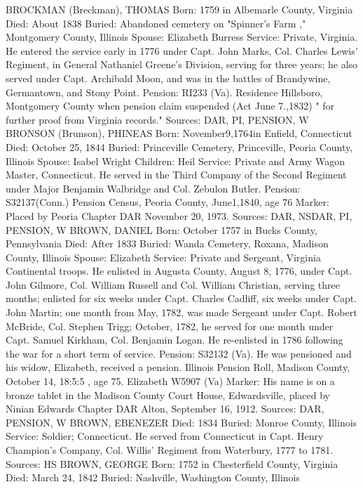 BROCKMAN (Breckman), THOMAS 
Born: 1759 in Albemarle County, Virginia 
Died: About 1838 
Buried: Abandoned cemetery on "Spinner's Farm ," Montgomery County, Illinois 
Spouse: Elizabeth Burress 
Service: Private, Virginia. He entered the service early in 1776 under Capt. John Marks, Col. Charles Lewis' Regiment, in General Nathaniel Greene's Division, serving for three years; he also served under Capt. Archibald Moon, and was in the battles of Brandywine, Germantown, and Stony Point. Pension: RI233 (Va). Residence Hillsboro, Montgomery County when pension claim suspended (Act June 7.,1832) " for further proof from Virginia records." 
Sources: DAR, PI, PENSION, W 
BRONSON (Brunson), PHINEAS 
Born: November9,1764in Enfield, Connecticut 
Died: October 25, 1844 
Buried: Princeville Cemetery, Princeville, Peoria County, Illinois 
Spouse: Isabel Wright 
Children: Heil 
Service: Private and Army Wagon Master, Connecticut. He served in the Third Company of the Second Regiment under Major Benjamin Walbridge and Col. Zebulon Butler. 
Pension: S32137(Conn.) Pension Census, Peoria County, June1,1840, age 76 
Marker: Placed by Peoria Chapter DAR November 20, 1973. 
Sources: DAR, NSDAR, PI, PENSION, W 
BROWN, DANIEL 
Born: October 1757 in Bucks County, Pennsylvania 
Died: After 1833 
Buried: Wanda Cemetery, Roxana, Madison County, Illinois 
Spouse: Elizabeth 
Service: Private and Sergeant, Virginia Continental troops. He enlisted in Augusta County, August 8, 1776, under Capt. John Gilmore, Col. William Russell and Col. William Christian, serving three months; enlisted for six weeks under Capt. Charles Cadliff, six weeks under Capt. John Martin; one month from May, 1782, was made Sergeant under Capt. Robert McBride, Col. Stephen Trigg; October, 1782, he served for one month under Capt. Samuel Kirkham, Col. Benjamin Logan. He re-enlisted in 1786 following the war for a short term of service. 
Pension: S32132 (Va). He was pensioned and his widow, Elizabeth, received a pension. Illinois Pension Roll, Madison County, October 14, 18:5:5 , age 75. Elizabeth W5907 (Va) 
Marker: His name is on a bronze tablet in the Madison County Court House, Edwardsville, placed by Ninian Edwards Chapter DAR Alton, September 16, 1912. 
Sources: DAR, PENSION, W 
BROWN, EBENEZER 
Died: 1834 
Buried: Monroe County, Illinois 
Service: Soldier; Connecticut. He served from Connecticut in Capt. Henry Champion's Company, Col. Willis' Regiment from Waterbury, 1777 to 1781. 
Sources: HS 
BROWN, GEORGE 
Born: 1752 in Chesterfield County, Virginia 
Died: March 24, 1842 
Buried: Nashville, Washington County, Illinois 
